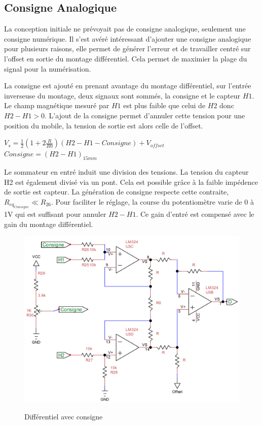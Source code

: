 \documentclass[11pt, french]{article} %
\begin{document}
\subsection{Consigne Analogique}
La conception initiale ne prévoyait pas de consigne analogique, seulement une consigne numérique. Il s'est avéré intéressant d'ajouter une consigne analogique pour plusieurs raisons, elle permet de générer l'erreur et de travailler centré sur l'offset en sortie du montage différentiel. Cela permet de maximier la plage du signal pour la numérisation.

La consigne est ajouté en prenant avantage du montage différentiel, sur l'entrée inverseuse du montage, deux signaux sont sommés, la consigne et le capteur $H1$. Le champ magnétique mesuré par $H1$ est plus faible que celui de $H2$ donc $H2-H1>0$. L'ajout de la consigne permet d'annuler cette tension pour une position du mobile, la tension de sortie est alors celle de l'offset.
\begin{center}
$V_s=\frac{1}{2}(1+2 \frac{R}{R0})(H2-H1-Consigne) + V_{offset}$
\hspace{1cm}$Consigne = (H2-H1)_{15mm}$
\end{center}

Le sommateur en entré induit une division des tensions. La tension du capteur H2 est également divisé via un pont. Cela est possible grâce à la faible impédence de sortie est capteur. La génération de consigne respecte cette contraite, $R_{eq_{Consigne}} \ll R_{26}$. Pour faciliter le réglage, la course du potentiomètre varie de 0 à 1V qui est suffisant pour annuler $H2-H1$. Ce gain d'entré est compensé avec le gain du montage différentiel. 
\begin{figure}[h!]
  \center
  \includegraphics[width=\linewidth]{SolutionAnalogique/AmpInstCons}
  \label{}
  \caption{Différentiel avec consigne}
\end{figure}
\end{document}

